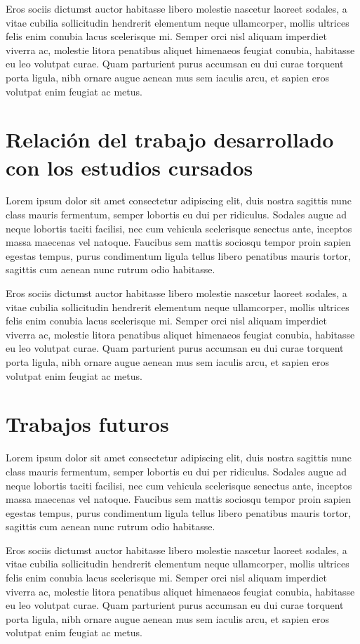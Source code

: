 \documentclass{article}
\begin{document}
Eros sociis dictumst auctor habitasse libero molestie nascetur laoreet sodales, a vitae cubilia sollicitudin hendrerit elementum neque ullamcorper, mollis ultrices felis enim conubia lacus scelerisque mi. Semper orci nisl aliquam imperdiet viverra ac, molestie litora penatibus aliquet himenaeos feugiat conubia, habitasse eu leo volutpat curae. Quam parturient purus accumsan eu dui curae torquent porta ligula, nibh ornare augue aenean mus sem iaculis arcu, et sapien eros volutpat enim feugiat ac metus.
\newpage

\section{Relación del trabajo desarrollado con los estudios cursados}
Lorem ipsum dolor sit amet consectetur adipiscing elit, duis nostra sagittis nunc class mauris fermentum, semper lobortis eu dui per ridiculus. Sodales augue ad neque lobortis taciti facilisi, nec cum vehicula scelerisque senectus ante, inceptos massa maecenas vel natoque. Faucibus sem mattis sociosqu tempor proin sapien egestas tempus, purus condimentum ligula tellus libero penatibus mauris tortor, sagittis cum aenean nunc rutrum odio habitasse.

Eros sociis dictumst auctor habitasse libero molestie nascetur laoreet sodales, a vitae cubilia sollicitudin hendrerit elementum neque ullamcorper, mollis ultrices felis enim conubia lacus scelerisque mi. Semper orci nisl aliquam imperdiet viverra ac, molestie litora penatibus aliquet himenaeos feugiat conubia, habitasse eu leo volutpat curae. Quam parturient purus accumsan eu dui curae torquent porta ligula, nibh ornare augue aenean mus sem iaculis arcu, et sapien eros volutpat enim feugiat ac metus.
\newpage

\section{Trabajos futuros}
Lorem ipsum dolor sit amet consectetur adipiscing elit, duis nostra sagittis nunc class mauris fermentum, semper lobortis eu dui per ridiculus. Sodales augue ad neque lobortis taciti facilisi, nec cum vehicula scelerisque senectus ante, inceptos massa maecenas vel natoque. Faucibus sem mattis sociosqu tempor proin sapien egestas tempus, purus condimentum ligula tellus libero penatibus mauris tortor, sagittis cum aenean nunc rutrum odio habitasse.

Eros sociis dictumst auctor habitasse libero molestie nascetur laoreet sodales, a vitae cubilia sollicitudin hendrerit elementum neque ullamcorper, mollis ultrices felis enim conubia lacus scelerisque mi. Semper orci nisl aliquam imperdiet viverra ac, molestie litora penatibus aliquet himenaeos feugiat conubia, habitasse eu leo volutpat curae. Quam parturient purus accumsan eu dui curae torquent porta ligula, nibh ornare augue aenean mus sem iaculis arcu, et sapien eros volutpat enim feugiat ac metus.
\newpage
\end{document}
